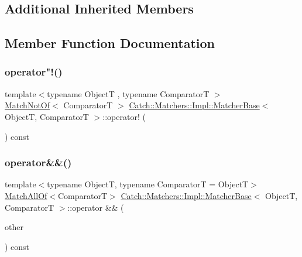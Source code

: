 \subsection*{Additional Inherited Members}


\subsection{Member Function Documentation}
\mbox{\label{structCatch_1_1Matchers_1_1Impl_1_1MatcherBase_a85174b5b27113f7bdc47c140c1c72602}} 
\subsubsection{\texorpdfstring{operator"!()}{operator!()}}
{\footnotesize\ttfamily template$<$typename ObjectT , typename ComparatorT $>$ \\
\mbox{\hyperlink{structCatch_1_1Matchers_1_1Impl_1_1MatchNotOf}{Match\+Not\+Of}}$<$ ComparatorT $>$ \mbox{\hyperlink{structCatch_1_1Matchers_1_1Impl_1_1MatcherBase}{Catch\+::\+Matchers\+::\+Impl\+::\+Matcher\+Base}}$<$ ObjectT, ComparatorT $>$\+::operator! (\begin{DoxyParamCaption}{ }\end{DoxyParamCaption}) const}

\mbox{\label{structCatch_1_1Matchers_1_1Impl_1_1MatcherBase_a3deede6b29d20c15cb5efc79df40a520}} 
\subsubsection{\texorpdfstring{operator\&\&()}{operator\&\&()}}
{\footnotesize\ttfamily template$<$typename ObjectT, typename ComparatorT = ObjectT$>$ \\
\mbox{\hyperlink{structCatch_1_1Matchers_1_1Impl_1_1MatchAllOf}{Match\+All\+Of}}$<$ComparatorT$>$ \mbox{\hyperlink{structCatch_1_1Matchers_1_1Impl_1_1MatcherBase}{Catch\+::\+Matchers\+::\+Impl\+::\+Matcher\+Base}}$<$ ObjectT, ComparatorT $>$\+::operator \&\& (\begin{DoxyParamCaption}\item[{\mbox{\hyperlink{structCatch_1_1Matchers_1_1Impl_1_1MatcherBase}{Matcher\+Base}}$<$ ObjectT, ComparatorT $>$ const \&}]{other }\end{DoxyParamCaption}) const}


